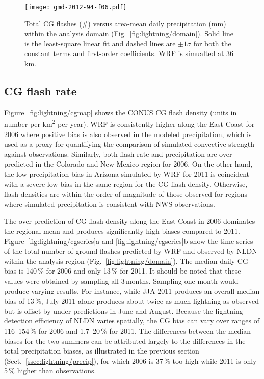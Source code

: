\begin{figure}[t]
\texttt{[image: gmd-2012-94-f06.pdf]}
\caption{Total CG flashes (\#) versus area-mean daily precipitation
(\unit{mm}) within the analysis domain (Fig.~\ref{fig:lightning/domain}). Solid line is
the least-square linear fit and dashed lines are $\pm1\sigma$ for both the
constant terms and first-order coefficients. WRF is simualted at
36\,\unit{km}.}
      \label{fig:lightning/cgslope}
\end{figure}

\subsection{CG flash rate}\label{ssec:lightning/flashrate}

Figure~\ref{fig:lightning/cgmap} shows the CONUS CG flash density (units in number per
\unit{km^2} per year). WRF is consistently higher along the East Coast for
2006 where positive bias is also observed in the modeled precipitation, which
is used as a proxy for quantifying the comparison of simulated convective
strength against observations. Similarly, both flash rate and precipitation
are over-predicted in the Colorado and New Mexico region for 2006. On the
other hand, the low precipitation bias in Arizona simulated by WRF for 2011
is coincident with a severe low bias in the same region for the CG flash
density. Otherwise, flash densities are within the order of magnitude of
those observed for regions where simulated precipitation is consistent with
NWS observations.

The over-prediction of CG flash density along the East Coast in 2006
dominates the regional mean and produces significantly high biases compared
to 2011. Figure~\ref{fig:lightning/cgseries}a and \ref{fig:lightning/cgseries}b show the time
series of the total number of ground flashes predicted by WRF and observed by
NLDN within the analysis region (Fig.~\ref{fig:lightning/domain}). The median daily CG
bias is 140\,{\%} for 2006 and only 13\,{\%} for 2011. It should be noted
that these values were obtained by sampling all 3\,months. Sampling one month
would produce varying results. For instance, while JJA 2011 produces an
overall median bias of 13\,{\%}, July 2011 alone produces about twice as much
lightning as observed but is offset by under-predictions in June and August.
Because the lightning detection efficiency of NLDN varies spatially, the CG
bias can vary over ranges of 116--154\,{\%} for 2006 and 1.7--20\,{\%} for 2011.
The differences between the median biases for the two
summers can be attributed largely to the differences in the total
precipitation biases, as illustrated in the previous section
(Sect.~\ref{ssec:lightning/precip}), for which 2006 is 37\,{\%} too high while 2011 is
only 5\,{\%} higher than observations.

